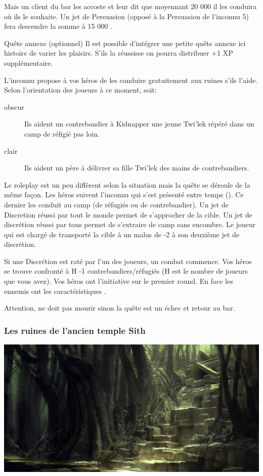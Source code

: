 Mais un client du bar les accoste et leur dit que moyennant 20 000 \crg il les conduira où ils le souhaite. Un jet de Persuasion (opposé à la Persuasion de l’inconnu 5) fera descendre la somme à 15 000 \crg.

\begin{paperbox}{Quête annexe (optionnel)}
    Il est possible d’intégrer une petite quête annexe ici histoire de varier les plaisirs. S’ils la réussisse on pourra distribuer +1 XP supplémentaire.

    L’inconnu propose à vos héros de les conduire gratuitement aux ruines s’ils l’aide. Selon l’orientation des joueurs à ce moment, soit:
    \begin{description}
        \item [obscur] Ils aident un contrebandier à Kidnapper une jeune Twi’lek répéré dans un camp de réfigié pas loin.
        \item [clair] Ils aident un père à délivrer sa fille Twi’lek des mains de contrebandiers.
    \end{description}

    Le roleplay est un peu différent selon la situation mais la quête se déroule de la même façon. Les héros suivent l’inconnu qui s’est présenté entre temps (). Ce dernier les conduit au camp (de réfugiés ou de contrebandier). Un jet de Discretion réussi par tout le monde permet de s’approcher de la cible. Un jet de discrétion réussi par tous permet de s’extraire de camp sans encombre. Le joueur qui est chargé de transporté la cible à un malus de -2 à son deuxième jet de discrétion.

    Si une Discrétion est raté par l’un des joueurs, un combat commence. Vos héros se trouve confronté à H -1 contrebandiers/réfugiés (H est le nombre de joueurs que vous avez). Vos héros ont l’initiative sur le premier round. En face les ennemis ont les caractéristiques .

    Attention,  ne doit pas mourir sinon la quête est un échec et retour au bar. 
\end{paperbox}

\subsubsection{Les ruines de l’ancien temple Sith}
\noindent\includegraphics[width=\linewidth]{_img/dos-au-muur/taris-temple-sith.png}

